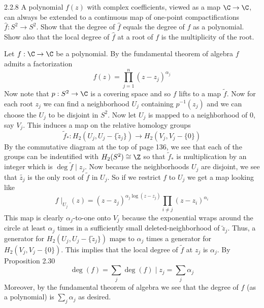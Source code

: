 \documentclass{article}
\begin{document}
\begin{exercise}{2.2.8}{\parindent}
  A polynomial $f(z)$ with complex coefficients, viewed as a map $\C
  \to \C$, can always be extended to a continuous map of one-point
  compactifications $\hat{f}: S^2 \to S^2$. Show that the degree of
  $\hat{f}$ equals the degree of $f$ as a polynomial. Show also that
  the local degree of $\hat{f}$ at a root of $f$ is the multiplicity
  of the root.
\end{exercise}
\begin{solution}{\parindent}
  Let $f: \C \to \C$ be a polynomial. By the fundamental theorem of
  algebra $f$ admits a factorization
  \[
  f(z) = \prod_{j=1}^n (z-z_j)^{\alpha_j}
  \]
  Now note that $p:S^2 \to \C$ is a covering space and so $f$ lifts to
  a map $\tilde{f}$. Now for each root $z_j$ we can find a
  neighborhood $U_j$ containing $p^{-1}(z_j)$ and we can choose the
  $U_j$ to be disjoint in $S^2$. Now let $U_j$ is mapped to a
  neighborhood of $0$, say $V_j$. This induces a map on the relative
  homology groups
  \[
  \tilde{f}_\ast: H_2(U_j, U_j - \{\tilde{z}_j\}) \to H_2(V_j, V_j - \{0\})
  \]
  By the commutative diagram at the top of page 136, we see that each
  of the groups can be indentified with $H_2(S^2) \cong \Z$ so that
  $\tilde{f}_\ast$ is multiplication by an integer which is $\deg
  \tilde{f}\mid z_j$. Now because the neighborhoods $U_j$ are
  disjoint, we see that $\tilde{z_j}$ is the only root of $\tilde{f}$
  in $U_j$. So if we restrict $f$ to $U_j$ we get a map looking like
  \[
  f\mid_{U_j}(z) = (z-z_j)^{\alpha_j\log(z-z_j)}\prod_{i\neq
    j}(z-z_i)^{\alpha_i}
  \]
  This map is clearly $\alpha_j$-to-one onto $V_j$ because the
  exponential wraps around the circle at least $\alpha_j$ times in a
  sufficiently small deleted-neighborhood of $\tilde{z}_j$. Thus, a
  generator for $H_2(U_j,U_j-\{\tilde{z}_j\})$ maps to $\alpha_j$
  times a generator for $H_2(V_j,V_j-\{0\})$. This implies that the
  local degree of $\tilde{f}$ at $z_j$ is $\alpha_j$. By Proposition
  2.30
  \[
  \deg(f) = \sum_j \deg(f)\mid z_j = \sum_j \alpha_j
  \]
  Moreover, by the fundamental theorem of algebra we see that the
  degree of $f$ (as a polynomial) is $\sum_j \alpha_j$ as desired.
\end{solution}
\end{document}
